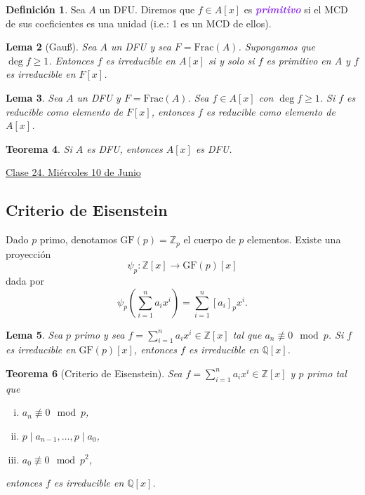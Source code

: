 \documentclass{article}
\newtheorem{theorem}{Teorema}[subsection]
\newtheorem{lemma}[theorem]{Lema}
\theoremstyle{definition}
\newtheorem{definition}[theorem]{Definición}
\theoremstyle{remark}
\numberwithin{equation}{section}
\newcommand{\Q}{\mathbb{Q}}
\newcommand{\Z}{\mathbb{Z}}
\newcommand{\Frac}{\mathrm{Frac}}
\newcommand{\br}[1]{\left( #1 \right)}
\newcommand{\ds}{\displaystyle}
\newcommand{\wea}[1]{\textcolor{BlueViolet}{\textbf{\emph{#1}}}}
\newcommand{\fecha}[1]{\begin{flushright} \underline{#1} \end{flushright}}
\begin{document}
\begin{definition}
  Sea $A$ un DFU. Diremos que $f \in A[x]$ es \wea{primitivo} si el MCD de sus coeficientes es una unidad (i.e.: 1 es un MCD de ellos).
\end{definition}

\begin{lemma}
  [Gauß]
  Sea $A$ un DFU y sea $F = \Frac(A)$. Supongamos que $\deg{f} \geq 1$. Entonces $f$ es irreducible en $A[x]$ si y solo si $f$ es primitivo en $A$ y $f$ es irreducible en $F[x]$.
\end{lemma}

\begin{lemma}
  Sea $A$ un DFU y $F = \Frac(A)$. Sea $f \in A[x]$ con $\deg{f} \geq 1$. Si $f$ es reducible como elemento de $F[x]$, entonces $f$ es reducible como elemento de $A[x]$.
\end{lemma}

\begin{theorem}
  Si $A$ es DFU, entonces $A[x]$ es DFU.
\end{theorem}

\fecha{Clase 24. Miércoles 10 de Junio}

\subsection{Criterio de Eisenstein}

Dado $p$ primo, denotamos $\mathrm{GF}(p) = \Z_p$ el cuerpo de $p$ elementos. Existe una proyección
\[ \psi_p \colon \Z[x] \to \mathrm{GF}(p)[x] \]
dada por
\[ \psi_p\br{\sum_{i=1}^n a_i x^i} = \sum_{i=1}^n [a_i]_p x^i. \]

\begin{lemma}
  Sea $p$ primo y sea $\ds f = \sum_{i=1}^n a_i x^i \in \Z[x]$ tal que $a_n \not\equiv 0 \mod{p}$. Si $f$ es irreducible en $\mathrm{GF}(p)[x]$, entonces $f$ es irreducible en $\Q[x]$.
\end{lemma}

\begin{theorem}
  [Criterio de Eisenstein]
  Sea $\ds f = \sum_{i=1}^n a_i x^i \in \Z[x]$ y $p$ primo tal que
  \begin{enumerate}[(i)]
    \item $a_n \not\equiv 0 \mod{p}$,
    \item $p \mid a_{n-1}, \dots, p \mid a_0$,
    \item $a_0 \not\equiv 0 \mod{p^2}$,
  \end{enumerate}
  entonces $f$ es irreducible en $\Q[x]$.
\end{theorem}
\end{document}
